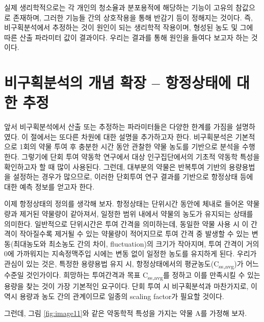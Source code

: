 \documentclass[
  11pt,
  krantz2, a4paper, twoside]{krantz}
\theoremstyle{definition}
\theoremstyle{definition}
\theoremstyle{definition}
\theoremstyle{definition}
\theoremstyle{remark}
\begin{document}
실제 생리학적으로는 각 개인의 청소율과 분포용적에 해당하는 기능이 고유의 참값으로 존재하며, 그러한 기능들 간의 상호작용을 통해 반감기 등이 정해지는 것이다.
즉, 비구획분석에서 추정하는 것이 원인이 되는 생리학적 작용이며, 형성된 농도 및 그에 따른 산출 파라미터 값이 결과이다.
우리는 결과를 통해 원인을 들여다 보고자 하는 것이다.

\hypertarget{uxbe44uxad6cuxd68duxbd84uxc11duxc758-uxac1cuxb150-uxd655uxc7a5-uxd56duxc815uxc0c1uxd0dcuxc5d0-uxb300uxd55c-uxcd94uxc815}{%
\section{비구획분석의 개념 확장 -- 항정상태에 대한 추정}\label{uxbe44uxad6cuxd68duxbd84uxc11duxc758-uxac1cuxb150-uxd655uxc7a5-uxd56duxc815uxc0c1uxd0dcuxc5d0-uxb300uxd55c-uxcd94uxc815}}

 

앞서 비구획분석에서 산출 또는 추정하는 파라미터들은 다양한 한계를 가짐을 설명하였다.
이 절에서는 또다른 차원에 대한 설명을 추가하고자 한다.
비구획분석은 기본적으로 1회의 약물 투여 후 충분한 시간 동안 관찰한 약물 농도를 기반으로 분석을 수행한다.
그렇기에 단회 투여 약동학 연구에서 대상 인구집단에서의 기초적 약동학 특성을 확인하고자 할 때 많이 사용된다.
그런데, 대부분의 약물은 반복투여 기반의 용량용법을 설정하는 경우가 많으므로, 이러한 단회투여 연구 결과를 기반으로 항정상태 등에 대한 예측 정보를 얻고자 한다.

이제 항정상태의 정의를 생각해 보자.
항정상태는 단위시간 동안에 체내로 들어온 약물량과 제거된 약물량이 같아져서, 일정한 범위 내에서 약물의 농도가 유지되는 상태를 의미한다.
일반적으로 단위시간은 투여 간격을 의미하는데, 동일한 약물 사용 시 이 간격이 작아질수록 제거될 수 있는 약물량이 적어지므로 투여 간격 중 발생할 수 있는 변동(최대농도와 최소농도 간의 차이, fluctuation)의 크기가 작아지며, 투여 간격이 거의 0에 가까워지는 지속정맥주입 시에는 변동 없이 일정한 농도를 유지하게 된다. 우리가 관심이 있는 것은, 특정한 용량용법 유지 시, 항정상태에서의 평균농도(C\textsubscript{ss,avg})가 어느 수준일 것인가이다. 
희망하는 투여간격과 목표 C\textsubscript{ss,avg}를 정하고 이를 만족시킬 수 있는 용량을 찾는 것이 가장 기본적인 요구이다.
단회 투여 시 비구획분석과 마찬가지로, 이 역시 용량과 농도 간의 관계이므로 일종의 scaling factor가 필요할 것이다.

그런데, 그림 \ref{fig:image11}와 같은 약동학적 특성을 가지는 약물 A를 가정해 보자.
\end{document}

